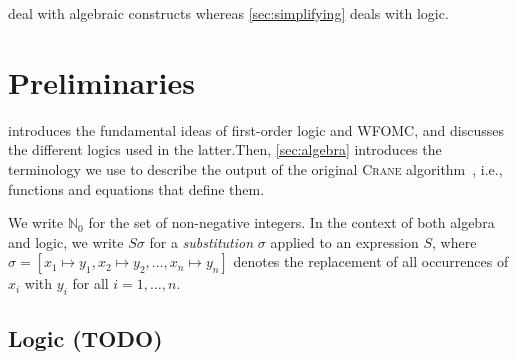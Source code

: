 \documentclass{article}
\theoremstyle{definition}
\begin{document}
 deal with algebraic constructs whereas
\cref{sec:simplifying} deals with logic.

\section{Preliminaries}

 introduces the fundamental ideas of first-order logic and
WFOMC, and discusses the different logics used in the latter.\@ Then,
\cref{sec:algebra} introduces the terminology we use to describe the output of
the original \textsc{Crane} algorithm~\cite{DBLP:conf/kr/DilkasB23}, i.e.,
functions and equations that define them.

We write $\mathbb{N}_{0}$ for the set of non-negative integers. In the context
of both algebra and logic, we write $S\sigma$ for a \emph{substitution} $\sigma$
applied to an expression $S$, where
$\sigma = [x_{1} \mapsto y_{1}, x_{2} \mapsto y_{2}, \dots, x_{n} \mapsto y_{n}]$
denotes the replacement of all occurrences of $x_{i}$ with $y_{i}$ for all
$i = 1, \dots, n$.

\subsection{Logic (TODO)}\label{sec:logic}

\end{document}
